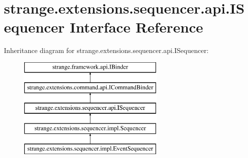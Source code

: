 \hypertarget{interfacestrange_1_1extensions_1_1sequencer_1_1api_1_1_i_sequencer}{\section{strange.\-extensions.\-sequencer.\-api.\-I\-Sequencer Interface Reference}
\label{interfacestrange_1_1extensions_1_1sequencer_1_1api_1_1_i_sequencer}
}
Inheritance diagram for strange.\-extensions.\-sequencer.\-api.\-I\-Sequencer\-:\begin{figure}[H]
\begin{center}
\leavevmode
\includegraphics[height=5.000000cm]{interfacestrange_1_1extensions_1_1sequencer_1_1api_1_1_i_sequencer}
\end{center}
\end{figure}

